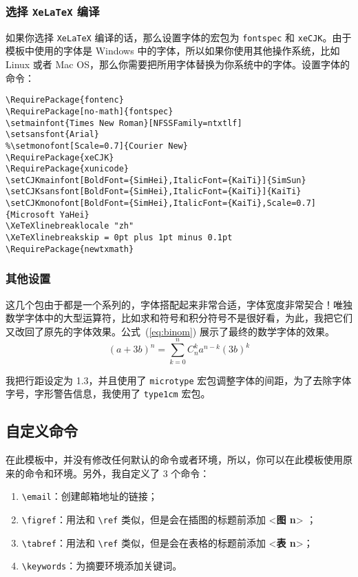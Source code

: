 \documentclass[lang=cn]{elegantpaper}
\begin{document}
\subsubsection[选择 XeLaTeX 编译]{选择 \lstinline{XeLaTeX} 编译}
如果你选择 \lstinline{XeLaTeX} 编译的话，那么设置字体的宏包为 \lstinline{fontspec} 和 \lstinline{xeCJK}。由于模板中使用的字体是 Windows 中的字体，所以如果你使用其他操作系统，比如 Linux 或者 Mac OS，那么你需要把所用字体替换为你系统中的字体。设置字体的命令：

\begin{lstlisting}
\RequirePackage{fontenc}
\RequirePackage[no-math]{fontspec}
\setmainfont{Times New Roman}[NFSSFamily=ntxtlf]
\setsansfont{Arial}
%\setmonofont[Scale=0.7]{Courier New}
\RequirePackage{xeCJK}
\RequirePackage{xunicode}
\setCJKmainfont[BoldFont={SimHei},ItalicFont={KaiTi}]{SimSun}
\setCJKsansfont[BoldFont={SimHei},ItalicFont={KaiTi}]{KaiTi}
\setCJKmonofont[BoldFont={SimHei},ItalicFont={KaiTi},Scale=0.7]{Microsoft YaHei}
\XeTeXlinebreaklocale "zh"
\XeTeXlinebreakskip = 0pt plus 1pt minus 0.1pt
\RequirePackage{newtxmath}
\end{lstlisting}

\subsubsection{其他设置}

这几个包由于都是一个系列的，字体搭配起来非常合适，字体宽度非常契合！唯独数学字体中的大型运算符，比如求和符号和积分符号不是很好看，为此，我把它们又改回了原先的字体效果。公式~(\ref{eq:binom}) 展示了最终的数学字体的效果。
\begin{equation}
(a+3b)^{n} = \sum_{k=0}^{n} C_{n}^{k} a^{n-k} (3b)^k \label{eq:binom}
\end{equation}

我把行距设定为 1.3，并且使用了 \lstinline{microtype} 宏包调整字体的间距，为了去除字体字号，字形警告信息，我使用了 \lstinline{type1cm} 宏包。


\subsection{自定义命令}
在此模板中，并没有修改任何默认的命令或者环境，所以，你可以在此模板使用原来的命令和环境。另外，我自定义了 3 个命令：

\begin{enumerate}
	\item \lstinline{\email}：创建邮箱地址的链接；
	\item \lstinline{\figref}：用法和 \lstinline{\ref} 类似，但是会在插图的标题前添加 <\textbf{图 n}> ；
	\item \lstinline{\tabref}：用法和 \lstinline{\ref} 类似，但是会在表格的标题前添加 <\textbf{表 n}>；
	\item \lstinline{\keywords}：为摘要环境添加关键词。
\end{enumerate}
\end{document}
